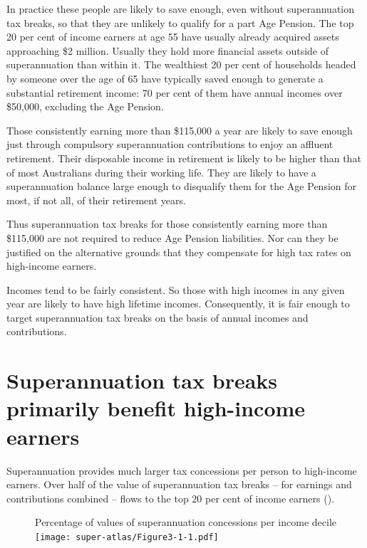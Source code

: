 In practice these people are likely to save enough, even without superannuation tax breaks, so that they are unlikely to qualify for a part Age Pension. The top 20 per cent of income earners at age 55 have usually already acquired assets approaching \$2 million. Usually they hold more financial assets outside of superannuation than within it. The wealthiest 20 per cent of households headed by someone over the age of 65 have typically saved enough to generate a substantial retirement income: 70 per cent of them have annual incomes over \$50,000, excluding the Age Pension.

Those consistently earning more than \$115,000 a year are likely to save enough just through compulsory superannuation contributions to enjoy an affluent retirement. Their disposable income in retirement is likely to be higher than that of most Australians during their working life. They are likely to have a superannuation balance large enough to disqualify them for the Age Pension for most, if not all, of their retirement years. 

Thus superannuation tax breaks for those consistently earning more than \$115,000 are not required to reduce Age Pension liabilities. Nor can they be justified on the alternative grounds that they compensate for high tax rates on high-income earners.

Incomes tend to be fairly consistent. So those with high incomes in any given year are likely to have high lifetime incomes. Consequently, it is fair enough to target superannuation tax breaks on the basis of annual incomes and contributions.

\section{Superannuation tax breaks primarily benefit high-income earners}
Superannuation provides much larger tax concessions per person to high-income earners. Over half of the value of superannuation tax breaks – for earnings and contributions combined – flows to the top 20 per cent of income earners ().

\begin{figure}
%
{Percentage of values of superannuation concessions per income decile}\label{fig:SUPER-3-1}
\texttt{[image: super-atlas/Figure3-1-1.pdf]}

\end{figure}

